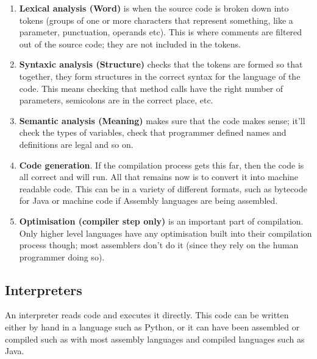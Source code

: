 \begin{enumerate}

	\item {\bf Lexical analysis (Word)} is when the source code is broken down into
	tokens (groups of one or more characters that represent something, like a
	parameter, punctuation, operands etc). This is where comments are filtered
	out of the source code; they are not included in the tokens.

	\item {\bf Syntaxic analysis (Structure)} checks that the tokens are formed so that
	together, they form structures in the correct syntax for the language of
	the code. This means checking that method calls have the right number of
	parameters, semicolons are in the correct place, etc.

	\item {\bf Semantic analysis (Meaning)} makes sure that the code makes sense; it'll
	check the types of variables, check that programmer defined names and
	definitions are legal and so on.

	\item {\bf Code generation}. If the compilation process gets this far, then
	the code is all correct and will run. All that remains now is to convert it
	into machine readable code. This can be in a variety of different formats,
	such as bytecode for Java or machine code if Assembly languages are being
	assembled.

	\item {\bf Optimisation (compiler step only)} is an important part of compilation. Only higher
	level languages have any optimisation built into their compilation process
	though; most assemblers don't do it (since they rely on the human
	programmer doing so).

\end{enumerate}


\subsection{Interpreters}

An interpreter reads code and executes it directly. This code can be written
either by hand in a language such as Python, or it can have been assembled or
compiled such as with most assembly languages and compiled languages such as
Java.


